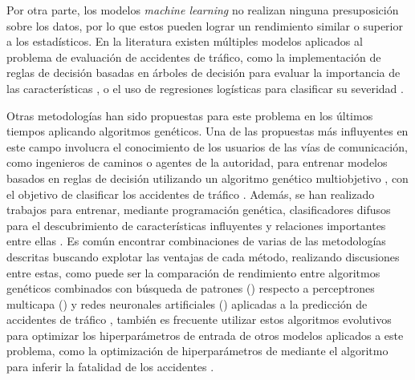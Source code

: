 Por otra parte, los modelos \textit{machine learning} no realizan ninguna presuposición sobre los datos, por lo que estos pueden lograr un rendimiento similar o superior a los estadísticos. En la literatura existen múltiples modelos aplicados al problema de evaluación de accidentes de tráfico, como la implementación de reglas de decisión basadas en árboles de decisión para evaluar la importancia de las características \cite{ArbolDecisionSeveridadDeAccidentes}, o el uso de regresiones logísticas para clasificar su severidad \cite{LogisticRegressionPrediccionAccidentes}.

Otras metodologías han sido propuestas para este problema en los últimos tiempos aplicando algoritmos genéticos. Una de las propuestas más influyentes en este campo involucra el conocimiento de los usuarios de las vías de comunicación, como ingenieros de caminos o agentes de la autoridad, para entrenar modelos basados en reglas de decisión utilizando un algoritmo genético multiobjetivo , con el objetivo de clasificar los accidentes de tráfico \cite{NSGAIIAccidentPrediction}. Además, se han realizado trabajos para entrenar, mediante programación genética, clasificadores difusos para el descubrimiento de características influyentes y relaciones importantes entre ellas \cite{GeneticProgrammingAccidents}. Es común encontrar combinaciones de varias de las metodologías descritas buscando explotar las ventajas de cada método, realizando discusiones entre estas, como puede ser la comparación de rendimiento entre algoritmos genéticos combinados con búsqueda de patrones () respecto a perceptrones multicapa () y redes neuronales artificiales () aplicadas a la predicción de accidentes de tráfico \cite{GAPSMLPANNAccidents}, también es frecuente utilizar estos algoritmos evolutivos para optimizar los hiperparámetros de entrada de otros modelos aplicados a este problema, como la optimización de hiperparámetros de  mediante el algoritmo  para inferir la fatalidad de los accidentes \cite{SVMPSOAccidents}.


